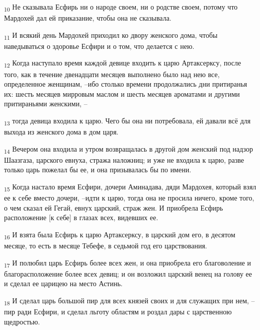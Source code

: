 \begin{tcolorbox}
\textsubscript{10} Не сказывала Есфирь ни о народе своем, ни о родстве своем, потому что Мардохей дал ей приказание, чтобы она не сказывала.
\end{tcolorbox}
\begin{tcolorbox}
\textsubscript{11} И всякий день Мардохей приходил ко двору женского дома, чтобы наведываться о здоровье Есфири и о том, что делается с нею.
\end{tcolorbox}
\begin{tcolorbox}
\textsubscript{12} Когда наступало время каждой девице входить к царю Артаксерксу, после того, как в течение двенадцати месяцев выполнено было над нею все, определенное женщинам, --ибо столько времени продолжались дни притиранья их: шесть месяцев мирровым маслом и шесть месяцев ароматами и другими притираньями женскими, --
\end{tcolorbox}
\begin{tcolorbox}
\textsubscript{13} тогда девица входила к царю. Чего бы она ни потребовала, ей давали всё для выхода из женского дома в дом царя.
\end{tcolorbox}
\begin{tcolorbox}
\textsubscript{14} Вечером она входила и утром возвращалась в другой дом женский под надзор Шаазгаза, царского евнуха, стража наложниц; и уже не входила к царю, разве только царь пожелал бы ее, и она призывалась бы по имени.
\end{tcolorbox}
\begin{tcolorbox}
\textsubscript{15} Когда настало время Есфири, дочери Аминадава, дяди Мардохея, который взял ее к себе вместо дочери, --идти к царю, тогда она не просила ничего, кроме того, о чем сказал ей Гегай, евнух царский, страж жен. И приобрела Есфирь расположение [к себе] в глазах всех, видевших ее.
\end{tcolorbox}
\begin{tcolorbox}
\textsubscript{16} И взята была Есфирь к царю Артаксерксу, в царский дом его, в десятом месяце, то есть в месяце Тебефе, в седьмой год его царствования.
\end{tcolorbox}
\begin{tcolorbox}
\textsubscript{17} И полюбил царь Есфирь более всех жен, и она приобрела его благоволение и благорасположение более всех девиц; и он возложил царский венец на голову ее и сделал ее царицею на место Астинь.
\end{tcolorbox}
\begin{tcolorbox}
\textsubscript{18} И сделал царь большой пир для всех князей своих и для служащих при нем, --пир ради Есфири, и сделал льготу областям и роздал дары с царственною щедростью.
\end{tcolorbox}

